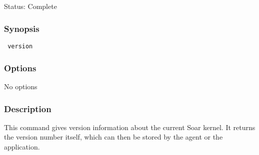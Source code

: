 \subsection{}
\label{version}
 Status: Complete
\subsubsection*{Synopsis}
\begin{verbatim}
 version
\end{verbatim}
\subsubsection*{Options}
 No options 
\subsubsection*{Description}
 This command gives version information about the current Soar kernel. It returns the version number itself, which can then be stored by the agent or the application. 
